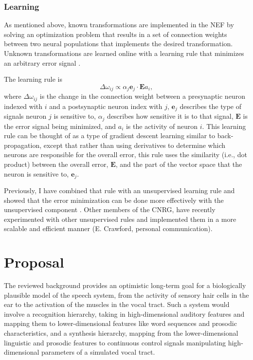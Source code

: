 \documentclass{article}
\begin{document}
\subsubsection{Learning}
\label{subsec:learning}

As mentioned above, known transformations
are implemented in the NEF by solving
an optimization problem
that results in a set of connection weights
between two neural populations
that implements the desired transformation.
Unknown transformations are learned
online with a learning rule
that minimizes an arbitrary error signal
\citep{macneil2011}.

The learning rule is
\begin{equation}
  \Delta \omega_{ij} \propto \alpha_j \mathbf{e}_j \cdot \mathbf{E} a_i,
\end{equation}
where $\Delta \omega_{ij}$ is the change in
the connection weight between
a presynaptic neuron indexed with $i$
and a postsynaptic neuron index with $j$,
$\mathbf{e}_j$ describes the type of signals
neuron $j$ is sensitive to,
$\alpha_j$ describes how sensitive
it is to that signal,
$\mathbf{E}$ is the error signal being minimized,
and $a_i$ is the activity of neuron $i$.
This learning rule can be thought of
as a type of gradient descent learning
similar to back-propagation,
except that rather than using
derivatives to determine which
neurons are responsible for the overall error,
this rule uses the similarity (i.e., dot product)
between the overall error, $\mathbf{E}$,
and the part of the vector space
that the neuron is sensitive to, $\mathbf{e}_j$.

Previously, I have combined that rule
with an unsupervised learning rule
and showed that the error minimization
can be done more effectively with
the unsupervised component
\citep{bekolay2013}.
Other members of the CNRG,
have recently experimented
with other unsupervised rules
and implemented them
in a more scalable and efficient manner
(E. Crawford, personal communication).

\section{Proposal}
\label{sec:proposal}

The reviewed background
provides an optimistic long-term
goal for a biologically plausible
model of the speech system,
from the activity of sensory
hair cells in the ear
to the activation of
the muscles in the vocal tract.
Such a system would involve
a recognition hierarchy,
taking in high-dimensional auditory features
and mapping them to lower-dimensional
features like word sequences
and prosodic characteristics,
and a synthesis hierarchy,
mapping from the lower-dimensional
linguistic and prosodic features
to continuous control signals
manipulating high-dimensional parameters
of a simulated vocal tract.
\end{document}
